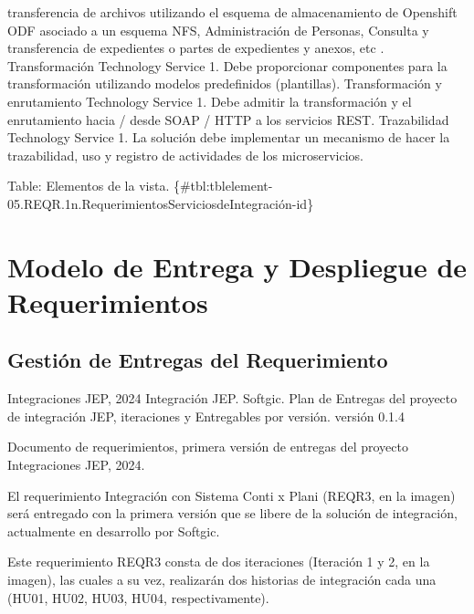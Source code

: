 \documentclass[
  paper=a4,
  ,captions=tableheading
]{scrartcl}
\renewenvironment{quote}{\begin{customblockquote}\list{}{\rightmargin=0em\leftmargin=0em}%
\item\relax\color{blockquote-text}\ignorespaces}{\unskip\unskip\endlist\end{customblockquote}}
\begin{document}
\begin{itemize}
  transferencia de archivos utilizando el esquema de almacenamiento de
  Openshift ODF asociado a un esquema NFS, Administración de Personas,
  Consulta y transferencia de expedientes o partes de expedientes y
  anexos, etc . \textbar{} \textbar{} Transformación \textbar{}
  Technology Service \textbar{} 1. Debe proporcionar componentes para la
  transformación utilizando modelos predefinidos (plantillas).
  \textbar{} \textbar{} Transformación y enrutamiento \textbar{}
  Technology Service \textbar{} 1. Debe admitir la transformación y el
  enrutamiento hacia / desde SOAP / HTTP a los servicios REST.
  \textbar{} \textbar{} Trazabilidad \textbar{} Technology Service
  \textbar{} 1. La solución debe implementar un mecanismo de hacer la
  trazabilidad, uso y registro de actividades de los microservicios.
  \textbar{}
\end{itemize}

Table: Elementos de la vista.
\{\#tbl:tblelement-05.REQR.1n.RequerimientosServiciosdeIntegración-id\}

\newpage

\section{Modelo de Entrega y Despliegue de
Requerimientos}\label{sec:modelo-de-entrega-y-despliegue-de-requerimientos}

\subsection{Gestión de Entregas del
Requerimiento}\label{sec:gestiuxf3n-de-entregas-del-requerimiento}

\begin{quote}
Integraciones JEP, 2024 Integración JEP. Softgic. Plan de Entregas del
proyecto de integración JEP, iteraciones y Entregables por versión.
versión 0.1.4
\end{quote}

Documento de requerimientos, primera versión de entregas del proyecto
Integraciones JEP, 2024.

El requerimiento Integración con Sistema Conti x Plani (REQR3, en la
imagen) será entregado con la primera versión que se libere de la
solución de integración, actualmente en desarrollo por Softgic.

Este requerimiento REQR3 consta de dos iteraciones (Iteración 1 y 2, en
la imagen), las cuales a su vez, realizarán dos historias de integración
cada una (HU01, HU02, HU03, HU04, respectivamente).
\end{document}
